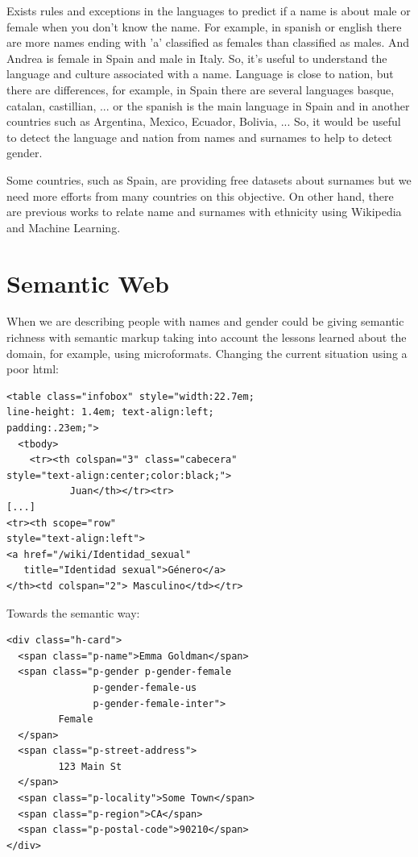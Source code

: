 \documentclass[a4paper]{article}
\begin{document}
Exists rules and exceptions in the languages to predict if a name is
about male or female when you don't know the name. For example, in
spanish or english there are more names ending with 'a' classified as
females than classified as males. And Andrea is female in Spain and
male in Italy. So, it's useful to understand the language and culture
associated with a name. Language is close to nation, but there are
differences, for example, in Spain there are several languages basque,
catalan, castillian, ... or the spanish is the main language in Spain
and in another countries such as Argentina, Mexico, Ecuador, Bolivia,
... So, it would be useful to detect the language and nation from
names and surnames to help to detect gender.

Some countries, such as Spain, are providing free datasets about
surnames but we need more efforts from many countries on this
objective. On other hand, there are previous works to relate name and
surnames with ethnicity using Wikipedia and Machine Learning.


\section{Semantic Web}
\label{sec:semantic}

When we are describing people with names and gender could be giving
semantic richness with semantic markup taking into account the lessons
learned about the domain, for example, using microformats. Changing the
current situation using a poor html:

\begin{verbatim}
<table class="infobox" style="width:22.7em; 
line-height: 1.4em; text-align:left; 
padding:.23em;">
  <tbody>
    <tr><th colspan="3" class="cabecera"
style="text-align:center;color:black;">
           Juan</th></tr><tr>
[...]
<tr><th scope="row"
style="text-align:left">
<a href="/wiki/Identidad_sexual" 
   title="Identidad sexual">Género</a>
</th><td colspan="2"> Masculino</td></tr>
\end{verbatim}

Towards the semantic way:

\begin{verbatim}
<div class="h-card">
  <span class="p-name">Emma Goldman</span>
  <span class="p-gender p-gender-female 
               p-gender-female-us 
               p-gender-female-inter">
         Female
  </span>      
  <span class="p-street-address">
         123 Main St
  </span>
  <span class="p-locality">Some Town</span>
  <span class="p-region">CA</span>
  <span class="p-postal-code">90210</span>
</div>
\end{verbatim}
\end{document}
